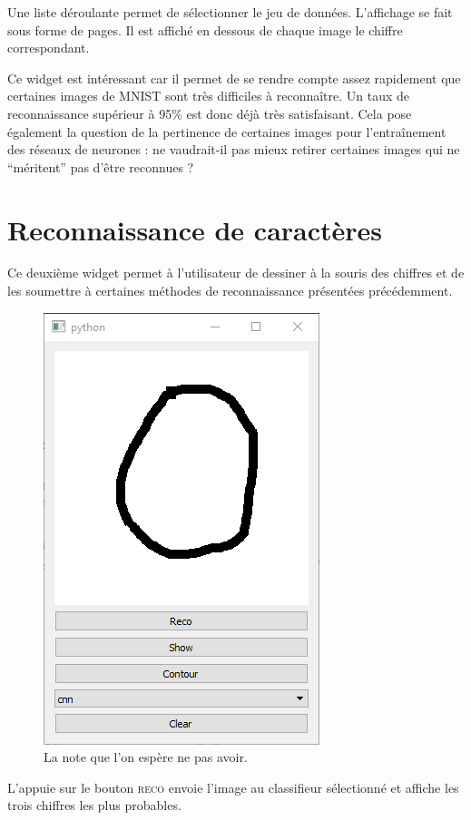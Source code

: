 Une liste déroulante permet de sélectionner le jeu de données.
L'affichage se fait sous forme de pages. 
Il est affiché en dessous de chaque image le chiffre correspondant.

Ce widget est intéressant car il permet de se rendre compte assez rapidement que 
certaines images de MNIST sont très difficiles à reconnaître. 
Un taux de reconnaissance supérieur à 95\% est donc déjà très satisfaisant.
Cela pose également la question de la pertinence de certaines images 
pour l'entraînement des réseaux de neurones : ne vaudrait-il pas mieux 
retirer certaines images qui ne ``méritent'' pas d'être reconnues ?


\section{Reconnaissance de caractères}

Ce deuxième widget permet à l'utilisateur de dessiner à la souris des chiffres 
et de les soumettre à certaines méthodes de reconnaissance présentées précédemment.

\begin{figure}[h]
  \centering
  \includegraphics[scale=0.66]{assets/draw-widget}
  \caption{La note que l'on espère ne pas avoir.}
\end{figure}

L'appuie sur le bouton \textsc{reco} envoie l'image au classifieur sélectionné 
et affiche les trois chiffres les plus probables.

